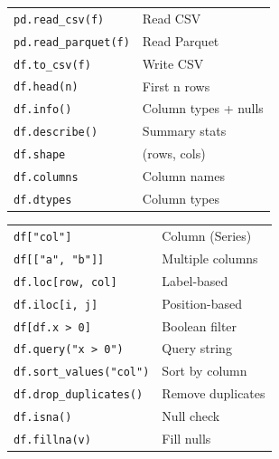 \documentclass[10pt]{extarticle}
\begin{document}
\begin{multicols}{2}
\begin{tabularx}{\linewidth}{@{}l@{\enspace}Y@{}}
\texttt{pd.read\_csv(f)}            & Read CSV \\
\texttt{pd.read\_parquet(f)}        & Read Parquet \\
\texttt{df.to\_csv(f)}              & Write CSV \\
\texttt{df.head(n)}                  & First n rows \\
\texttt{df.info()}                   & Column types + nulls \\
\texttt{df.describe()}               & Summary stats \\
\texttt{df.shape}                    & (rows, cols) \\
\texttt{df.columns}                  & Column names \\
\texttt{df.dtypes}                   & Column types \\
\end{tabularx}

\begin{tabularx}{\linewidth}{@{}l@{\enspace}Y@{}}
\texttt{df["col"]}                   & Column (Series) \\
\texttt{df[["a", "b"]]}             & Multiple columns \\
\texttt{df.loc[row, col]}           & Label-based \\
\texttt{df.iloc[i, j]}              & Position-based \\
\texttt{df[df.x > 0]}               & Boolean filter \\
\texttt{df.query("x > 0")}          & Query string \\
\texttt{df.sort\_values("col")}     & Sort by column \\
\texttt{df.drop\_duplicates()}      & Remove duplicates \\
\texttt{df.isna()}                   & Null check \\
\texttt{df.fillna(v)}               & Fill nulls \\
\end{tabularx}


\end{multicols}
\end{document}
